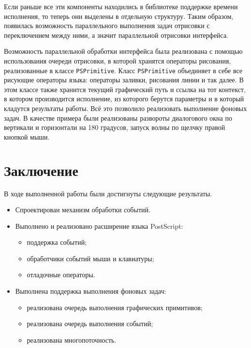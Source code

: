 Если раньше все эти компоненты находились в библиотеке поддержке времени исполнения, то теперь они выделены в отдельную структуру. Таким образом, появилась возможность параллельного выполнения задач отрисовки с переключением между ними, а значит параллельной отрисовки интерфейса. 

Возможность параллельной обработки интерфейса была реализована с помощью использования очереди отрисовки, в которой хранятся операторы рисования, реализованные в классе \texttt{PSPrimitive}. Класс \texttt{PSPrimitive} объединяет в себе все рисующие операторы языка: операторы заливки, рисования линии и так далее. В этом классе также хранится текущий графический путь и ссылка на тот контекст, в котором производится исполнение, из которого берутся параметры и в который кладутся результаты работы.
Всё это позволило реализовать выполнение фоновых задач. В качестве примера были реализованы развороты диалогового окна по вертикали и горизонтали на 180 градусов, запуск волны по щелчку правой кнопкой мыши.

\section*{Заключение}
В ходе выполненной работы были достигнуты следующие результаты.
\begin{itemize}
\item Спроектирован механизм обработки событий.
\item Выполнено и реализовано расширение языка PostScript:
\begin{itemize}
    \item поддержка событий;
    \item обработчики событий мыши и клавиатуры;
    \item отладочные операторы.
\end{itemize}
\item Выполнена поддержка выполнения фоновых задач:
\begin{itemize}
    \item реализована очередь выполнения графических примитивов;
    \item реализована очередь выполнения событий;
    \item реализована многопоточность.
\end{itemize}
\end{itemize}

